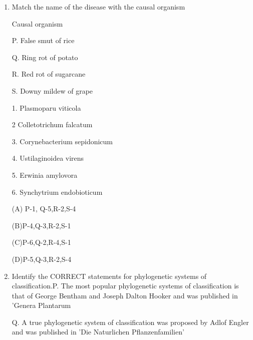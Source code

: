 \documentclass[journal]{IEEEtran}
\begin{document}
\begin{enumerate}
\begin{minipage}{0.5\textwidth}
\begin{flushleft}
6. Patatin

		\end{flushleft}
		\end{minipage}
(A)P-4,Q-3,R-5,S-2

(B)P-2,Q-3,R-6,S-1

(C)P-4,Q-2,R-1,S-3

(D)P-3,Q-2,R-2,S-5

\item {Match the name of the disease with the causal organism}
\newline
\begin{minipage}{0.5\textwidth}
	\begin{flushleft}
Causal organism

P. False smut of rice

Q. Ring rot of potato

R. Red rot of sugarcane

S. Downy mildew of grape



		\end{flushleft}
		\end{minipage}
	\begin{minipage}{0.5\textwidth}
		\begin{flushleft}

1. Plasmoparu viticola


2 Colletotrichum falcatum


3. Corynebacterium sepidonicum


4. Ustilaginoidea virens

5. Erwinia amylovora

6. Synchytrium endobioticum
		\end{flushleft}
		\end{minipage}


(A) P-1, Q-5,R-2,S-4

(B)P-4,Q-3,R-2,S-1

(C)P-6,Q-2,R-4,S-1

(D)P-5,Q-3,R-2,S-4


\item {Identify the CORRECT statements for phylogenetic systems of classification.\newline P. The most popular phylogenetic systems of classification is that of George Bentham and Joseph Dalton Hooker and was published in 'Genera Plantarum

Q. A true phylogenetic system of classification was proposed by Adlof Engler and was published in 'Die Naturlichen Pflanzenfamilien'

}
\end{enumerate}
\end{document}
